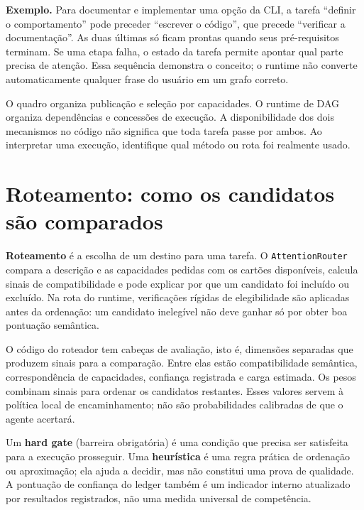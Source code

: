 \begin{descricao}
\textbf{Exemplo.} Para documentar e implementar uma opção da CLI, a tarefa
``definir o comportamento'' pode preceder ``escrever o código'', que precede
``verificar a documentação''. As duas últimas só ficam prontas quando seus
pré-requisitos terminam. Se uma etapa falha, o estado da tarefa permite apontar
qual parte precisa de atenção. Essa sequência demonstra o conceito; o runtime
não converte automaticamente qualquer frase do usuário em um grafo correto.
\end{descricao}

\begin{limite}
O quadro organiza publicação e seleção por capacidades. O runtime de DAG
organiza dependências e concessões de execução. A disponibilidade dos dois
mecanismos no código não significa que toda tarefa passe por ambos. Ao
interpretar uma execução, identifique qual método ou rota foi realmente usado.
\end{limite}

\section{Roteamento: como os candidatos são comparados}

\begin{descricao}
\textbf{Roteamento} é a escolha de um destino para uma tarefa. O
\texttt{AttentionRouter} compara a descrição e as capacidades pedidas com os
cartões disponíveis, calcula sinais de compatibilidade e pode explicar por que
um candidato foi incluído ou excluído. Na rota do runtime, verificações rígidas
de elegibilidade são aplicadas antes da ordenação: um candidato inelegível não
deve ganhar só por obter boa pontuação semântica.
\end{descricao}

\begin{resultado}
O código do roteador tem cabeças de avaliação, isto é, dimensões separadas que
produzem sinais para a comparação. Entre elas estão compatibilidade semântica,
correspondência de capacidades, confiança registrada e carga estimada. Os
pesos combinam sinais para ordenar os candidatos restantes. Esses valores
servem à política local de encaminhamento; não são probabilidades calibradas de
que o agente acertará.
\end{resultado}

\begin{conceito}
Um \textbf{hard gate} (barreira obrigatória) é uma condição que precisa ser
satisfeita para a execução prosseguir. Uma \textbf{heurística} é uma regra
prática de ordenação ou aproximação; ela ajuda a decidir, mas não constitui uma
prova de qualidade. A pontuação de confiança do ledger também é um indicador
interno atualizado por resultados registrados, não uma medida universal de
competência.
\end{conceito}

